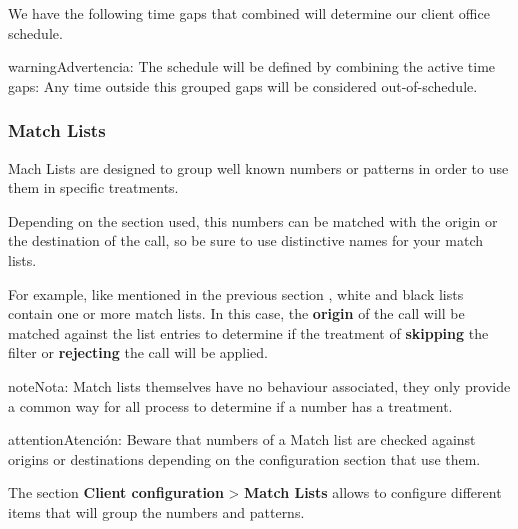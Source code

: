 \documentclass[letterpaper,10pt,spanish]{sphinxmanual}
\begin{document}
We have the following time gaps that combined will determine our client
office schedule.

\begin{notice}{warning}{Advertencia:}
The schedule will be defined by combining the active time gaps:
Any time outside this grouped gaps will be considered out-of-schedule.
\end{notice}
\label{administration_portal/client/vpbx/routing_tools/match_lists:match-lists}

\subsubsection{Match Lists}
\label{administration_portal/client/vpbx/routing_tools/match_lists:match-lists}\label{administration_portal/client/vpbx/routing_tools/match_lists:id2}\label{administration_portal/client/vpbx/routing_tools/match_lists::doc}\label{administration_portal/client/vpbx/routing_tools/match_lists:id1}
Mach Lists are designed to group well known numbers or patterns in order to use
them in specific treatments.

Depending on the section used, this numbers can be matched with the origin or
the destination of the call, so be sure to use distinctive names for your match
lists.

For example, like mentioned in the previous section {\hyperref[administration_portal/client/vpbx/routing_tools/external_call_filters:external\string-filters]{}},
white and black lists contain one or more match lists. In this case, the
\textbf{origin} of the call will be matched against the list entries to determine if
the treatment of \textbf{skipping} the filter or \textbf{rejecting} the call will be applied.

\begin{notice}{note}{Nota:}
Match lists themselves have no behaviour associated, they only provide
a common way for all process to determine if a number has a treatment.
\end{notice}

\begin{notice}{attention}{Atención:}
Beware that numbers of a Match list are checked against origins
or destinations depending on the configuration section that use them.
\end{notice}

The section \textbf{Client configuration} \textgreater{} \textbf{Match Lists} allows to configure
different items that will group the numbers and patterns.
\end{document}
